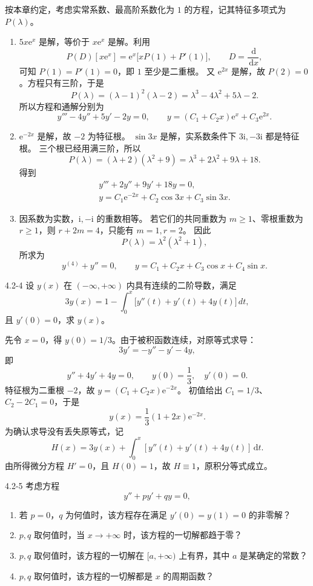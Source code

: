 \documentclass[UTF8,a4paper,11pt]{ctexart}
\newcommand{\dd}{\,\mathrm d}
\newcommand{\e}{\mathrm e}
\begin{document}
\begin{solution}
按本章约定，考虑实常系数、最高阶系数化为 $1$ 的方程，记其特征多项式为 $P(\lambda)$。
\begin{enumerate}[label=(\arabic*)]
\item $5x\e^x$ 是解，等价于 $x\e^x$ 是解。利用
\[
P(D)[x\e^x]=\e^x\bigl[xP(1)+P'(1)\bigr],\qquad D=\frac{\dd}{\dd x},
\]
可知 $P(1)=P'(1)=0$，即 $1$ 至少是二重根。
又 $\e^{2x}$ 是解，故 $P(2)=0$。方程只有三阶，于是
\[
P(\lambda)=(\lambda-1)^2(\lambda-2)
=\lambda^3-4\lambda^2+5\lambda-2.
\]
所以方程和通解分别为
\[
\boxed{y'''-4y''+5y'-2y=0,\qquad
y=(C_1+C_2x)\e^x+C_3\e^{2x}.}
\]

\item $\e^{-2x}$ 是解，故 $-2$ 为特征根。
$\sin3x$ 是解，实系数条件下 $3\mathrm i,-3\mathrm i$ 都是特征根。
三个根已经用满三阶，所以
\[
P(\lambda)=(\lambda+2)(\lambda^2+9)
=\lambda^3+2\lambda^2+9\lambda+18.
\]
得到
\[
\boxed{\begin{gathered}
y'''+2y''+9y'+18y=0,\\
y=C_1\e^{-2x}+C_2\cos3x+C_3\sin3x.
\end{gathered}}
\]

\item 因系数为实数，$\mathrm i,-\mathrm i$ 的重数相等。
若它们的共同重数为 $m\ge1$、零根重数为 $r\ge1$，则 $r+2m=4$，只能有 $m=1,r=2$。
因此
\[
P(\lambda)=\lambda^2(\lambda^2+1),
\]
所求为
\[
\boxed{y^{(4)}+y''=0,\qquad
y=C_1+C_2x+C_3\cos x+C_4\sin x.}
\]
\end{enumerate}
\end{solution}

\begin{problem}{4.2-4}
设 $y(x)$ 在 $(-\infty,+\infty)$ 内具有连续的二阶导数，满足
  \[
    3y(x)=1-\int_0^x\bigl[y''(t)+y'(t)+4y(t)\bigr]\,dt,
  \]
  且 $y'(0)=0$，求 $y(x)$。
\end{problem}

\begin{solution}
先令 $x=0$，得 $y(0)=1/3$。由于被积函数连续，对原等式求导：
\[
3y'=-y''-y'-4y,
\]
即
\[
y''+4y'+4y=0,\qquad y(0)=\frac13,\quad y'(0)=0.
\]
特征根为二重根 $-2$，故 $y=(C_1+C_2x)\e^{-2x}$。
初值给出 $C_1=1/3$、$C_2-2C_1=0$，于是
\[
\boxed{y(x)=\frac13(1+2x)\e^{-2x}.}
\]
为确认求导没有丢失原等式，记
\[
H(x)=3y(x)+\int_0^x[y''(t)+y'(t)+4y(t)]\dd t.
\]
由所得微分方程 $H'=0$，且 $H(0)=1$，故 $H\equiv1$，原积分等式成立。
\end{solution}

\begin{problem}{4.2-5}
考虑方程
  \[
    y''+py'+qy=0,
  \]
  \begin{enumerate}[label=(\arabic*)]
    \item 若 $p=0$，$q$ 为何值时，该方程存在满足 $y'(0)=y(1)=0$ 的非零解？
    \item $p,q$ 取何值时，当 $x\to+\infty$ 时，该方程的一切解都趋于零？
    \item $p,q$ 取何值时，该方程的一切解在 $[a,+\infty)$ 上有界，其中 $a$ 是某确定的常数？
    \item $p,q$ 取何值时，该方程的一切解都是 $x$ 的周期函数？
  \end{enumerate}
\end{problem}
\end{document}
